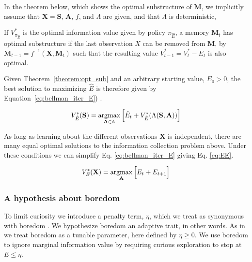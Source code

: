 In the theorem below, which shows the optimal substructure of $\mathbf{M}$, we implicitly assume that $\mathbf{X} = \mathbf{S}$, $\mathbf{A}$, $f$, and $\Lambda$ are given, and that $\Lambda$ is deterministic, 

\begin{theorem} \label{theorem:opt_sub} 
   If $V^*_{\pi_{\hat E}}$ is the optimal information value given by policy $\pi_{\hat E}$, a memory $\mathbf{M}_t$ has optimal substructure if the last observation $X$ can be removed from $\mathbf{M}$, by $\mathbf{M}_{t-1} = f^{-1}(\mathbf{X}, \mathbf{M}_t)$ such that the resulting value $V^*_{t-1} = V^*_{t} - E_{t}$ is also optimal. 
\end{theorem}

Given Theorem~\ref{theorem:opt_sub} and an arbitrary starting value, $E_0 > 0$, the best solution to maximizing $\hat E$ is therefore given by Equation~\ref{eq:bellman_iter_E}) \cite{Bellmann1954}.

\begin{equation} 
	\label{eq:bellman_iter_E}
	V^*_{\hat E}(\mathbf{S}) = \operatorname*{argmax}_{\mathbf{A} \in \mathbb{A}} \Big [ \hat E_{t}  + V^*_{\hat E}(\Lambda(\mathbf{S},\mathbf{A})) \Big ]
\end{equation}

As long as learning about the different observations $\mathbf{X}$ is independent, there are many equal optimal solutions to the information collection problem above. Under these conditions we can simplify Eq. \ref{eq:bellman_iter_E} giving Eq. \ref{eq:EE}. 

\begin{equation}
	\label{eq:EE} 
	V_E^{*}(\mathbf{X}) = \operatorname*{argmax}_{\mathbf{A}} \Big [ E_t + E_{t+1} \Big ]
\end{equation}

\subsubsection*{A hypothesis about boredom}
To limit curiosity we introduce a penalty term, $\eta$, which we treat as synonymous with boredom \cite{Hill1985,Schmidhuber1991,Bench2013a}. We hypothesize boredom an adaptive trait, in other words. As in \cite{Geana2016}we treat boredom as a tunable parameter, here defined by $\eta \ge 0$. We use boredom to ignore marginal information value by requiring curious exploration to stop at $E \le \eta$. 



